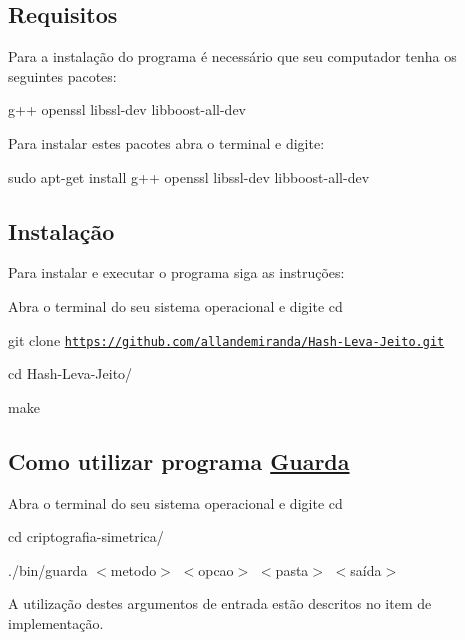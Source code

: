 \subsection*{Requisitos}

Para a instalação do programa é necessário que seu computador tenha os seguintes pacotes\+:

{\ttfamily g++ openssl libssl-\/dev libboost-\/all-\/dev}

Para instalar estes pacotes abra o terminal e digite\+:

{\ttfamily sudo apt-\/get install g++ openssl libssl-\/dev libboost-\/all-\/dev}

\subsection*{Instalação}

Para instalar e executar o programa siga as instruções\+:


\begin{DoxyEnumerate}
\item Abra o terminal do seu sistema operacional e digite {\ttfamily cd}
\item {\ttfamily git clone \href{https://github.com/allandemiranda/Hash-Leva-Jeito.git}{\tt https\+://github.\+com/allandemiranda/\+Hash-\/\+Leva-\/\+Jeito.\+git}}
\item {\ttfamily cd Hash-\/\+Leva-\/\+Jeito/}
\item {\ttfamily make}
\end{DoxyEnumerate}

\subsection*{Como utilizar programa \hyperlink{class_guarda}{Guarda}}


\begin{DoxyEnumerate}
\item Abra o terminal do seu sistema operacional e digite {\ttfamily cd}
\item {\ttfamily cd criptografia-\/simetrica/}
\item {\ttfamily ./bin/guarda $<$metodo$>$ $<$opcao$>$ $<$pasta$>$ $<$saída$>$}
\item A utilização destes argumentos de entrada estão descritos no item de implementação. 
\end{DoxyEnumerate}